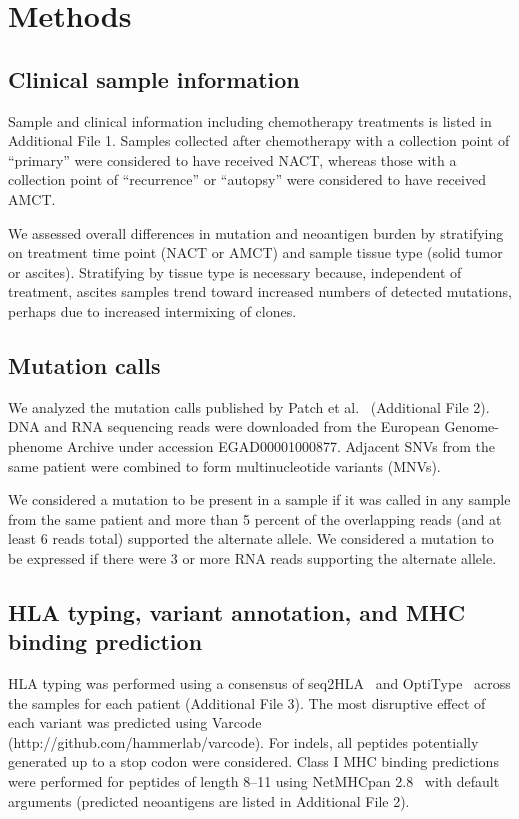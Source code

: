 \section*{Methods}

\subsection*{Clinical sample information}
Sample and clinical information including chemotherapy treatments is listed in Additional File 1. Samples collected after chemotherapy with a collection point of ``primary'' were considered to have received NACT, whereas those with a collection point of ``recurrence'' or ``autopsy'' were considered to have received AMCT.

We assessed overall differences in mutation and neoantigen burden by stratifying on treatment time point (NACT or AMCT) and sample tissue type (solid tumor or ascites). Stratifying by tissue type is necessary because, independent of treatment, ascites samples trend toward increased numbers of detected mutations, perhaps due to increased intermixing of clones.

\subsection*{Mutation calls}
We analyzed the mutation calls published by Patch et al.~\cite{Patch_2015} (Additional File 2). DNA and RNA sequencing reads were downloaded from the European Genome-phenome Archive under accession EGAD00001000877. Adjacent SNVs from the same patient were combined to form multinucleotide variants (MNVs). 

We considered a mutation to be present in a sample if it was called in any sample from the same patient and more than 5 percent of the overlapping reads (and at least 6 reads total) supported the alternate allele. We considered a mutation to be expressed if there were 3 or more RNA reads supporting the alternate allele.

\subsection*{HLA typing, variant annotation, and MHC binding prediction}
\begin{sloppypar}
HLA typing was performed using a consensus of seq2HLA~\cite{Boegel_2012} and OptiType~\cite{Szolek_2014} across the samples for each patient (Additional File 3). The most disruptive effect of each variant was predicted using Varcode (http://github.com/hammerlab/varcode). For indels, all peptides potentially generated up to a stop codon were considered. Class I MHC binding predictions were performed for peptides of length 8--11 using NetMHCpan 2.8~\cite{Lundegaard_2008} with default arguments (predicted neoantigens are listed in Additional File 2).
\end{sloppypar}

